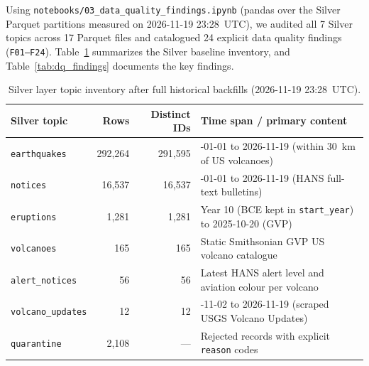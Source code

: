 \documentclass[11pt,a4paper]{article}
\begin{document}
Using \texttt{notebooks/03\_data\_quality\_findings.ipynb} (pandas over the Silver Parquet partitions measured on 2026-11-19 23:28~UTC), we audited all 7 Silver topics across 17 Parquet files and catalogued 24 explicit data quality findings (\texttt{F01--F24}). Table~\ref{tab:silver_inventory} summarizes the Silver baseline inventory, and Table~\ref{tab:dq_findings} documents the key findings.

\begin{table}[htbp]
\centering
\caption{Silver layer topic inventory after full historical backfills (2026-11-19 23:28~UTC).}\label{tab:silver_inventory}
\begin{tabularx}{\textwidth}{lrr >{\raggedright\arraybackslash}X}
\toprule
\textbf{Silver topic} & \textbf{Rows} & \textbf{Distinct IDs} & \textbf{Time span / primary content}\\
\midrule
\texttt{earthquakes} & 292,264 & 291,595 & 2010-01-01 to 2026-11-19 (within 30~km of US volcanoes)\\
\texttt{notices} & 16,537 & 16,537 & 2010-01-01 to 2026-11-19 (HANS full-text bulletins)\\
\texttt{eruptions} & 1,281 & 1,281 & Year 10 (BCE kept in \texttt{start\_year}) to 2025-10-20 (GVP)\\
\texttt{volcanoes} & 165 & 165 & Static Smithsonian GVP US volcano catalogue\\
\texttt{alert\_notices} & 56 & 56 & Latest HANS alert level and aviation colour per volcano\\
\texttt{volcano\_updates} & 12 & 12 & 2026-11-02 to 2026-11-19 (scraped USGS Volcano Updates)\\
\texttt{quarantine} & 2,108 & --- & Rejected records with explicit \texttt{reason} codes\\
\bottomrule
\end{tabularx}
\end{table}
\end{document}
